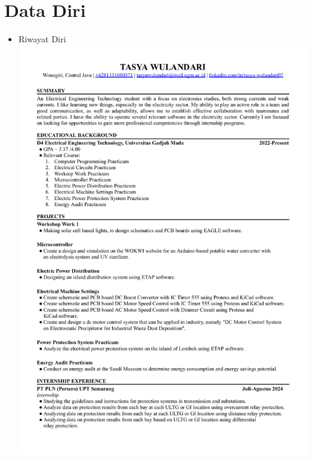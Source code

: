 \section{Data Diri {\penulisKedua}}
\begin{itemize}
	
	
	
	\item Riwayat Diri\\
	\includegraphics[scale=0.7,page=1]{dokumen/cv_tasya.pdf}
	\newpage

\end{itemize}
